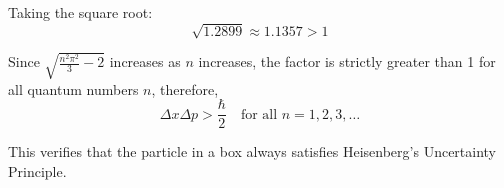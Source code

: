 \documentclass{article}
\begin{document}
Taking the square root:
\begin{equation*}
\sqrt{1.2899} \approx 1.1357 > 1
\end{equation*}

Since $\sqrt{\frac{n^2\pi^2}{3} - 2}$ increases as $n$ increases, the factor is strictly greater than 1 for all quantum numbers $n$, therefore,
\begin{equation*}
\Delta x \Delta p > \frac{\hbar}{2} \quad \text{for all } n = 1, 2, 3, \dots
\end{equation*}

This verifies that the particle in a box always satisfies Heisenberg's Uncertainty Principle.
\end{document}
